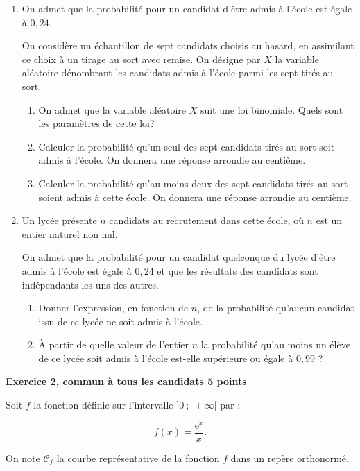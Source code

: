 \documentclass[10pt,a4paper,french]{article}
\begin{document}
\begin{enumerate}
\item On admet que la probabilité pour un candidat d'être admis à l'école est égale à $0,24$.

On considère un échantillon de sept candidats choisis au hasard, en assimilant ce choix à un tirage au sort avec remise. On désigne par $X$ la variable aléatoire dénombrant les candidats admis à l'école parmi les sept tirés au sort.
	\begin{enumerate}
		\item On admet que la variable aléatoire $X$ suit une loi binomiale. Quels sont les paramètres de cette loi?
		\item Calculer la probabilité qu'un seul des sept candidats tirés au sort soit admis à l'école. On donnera une réponse arrondie au centième.
		\item Calculer la probabilité qu'au moins deux des sept candidats tirés au sort soient admis à cette école. On donnera une réponse arrondie au centième.
	\end{enumerate}
\item  Un lycée présente $n$ candidats au recrutement dans cette école, où $n$ est un entier naturel non nul.

On admet que la probabilité pour un candidat quelconque du lycée d'être admis à l'école est égale à $0,24$ et que les résultats des candidats sont indépendants les uns des autres.
	\begin{enumerate}
		\item Donner l'expression, en fonction de $n$, de la probabilité qu'aucun candidat issu de ce lycée ne soit admis à l'école.
		\item À partir de quelle valeur de l'entier $n$ la probabilité qu'au moins un élève de ce lycée soit admis à l'école est-elle supérieure ou égale à $0,99$ ?
	\end{enumerate}
\end{enumerate}

\bigskip

\textbf{Exercice 2, commun à tous les candidats \hfill 5 points}

\medskip

Soit $f$ la fonction définie sur l'intervalle $]0~;~ +\infty[$ par :

\[f(x) = \dfrac{\text{e}^x}{x}.\]

On note $\mathcal{C}_f$ la courbe représentative de la fonction $f$ dans un repère orthonormé. 

\medskip
\end{document}
